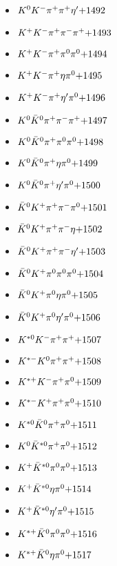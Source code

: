 \begin{multicols}{3}
\begin{itemize}
 \item $ K^{0} K^{-} \pi^{+} \pi^{+} {\eta^{\prime}} \hfill{+1492}$
 \item $ K^{+} K^{-} \pi^{+} \pi^{-} \pi^{+} \hfill{+1493}$
 \item $ K^{+} K^{-} \pi^{+} \pi^{0} \pi^{0} \hfill{+1494}$
 \item $ K^{+} K^{-} \pi^{+} \eta \pi^{0} \hfill{+1495}$
 \item $ K^{+} K^{-} \pi^{+} {\eta^{\prime}} \pi^{0} \hfill{+1496}$
 \item $ K^{0} \bar{K}^{0} \pi^{+} \pi^{-} \pi^{+} \hfill{+1497}$
 \item $ K^{0} \bar{K}^{0} \pi^{+} \pi^{0} \pi^{0} \hfill{+1498}$
 \item $ K^{0} \bar{K}^{0} \pi^{+} \eta \pi^{0} \hfill{+1499}$
 \item $ K^{0} \bar{K}^{0} \pi^{+} {\eta^{\prime}} \pi^{0} \hfill{+1500}$
 \item $ \bar{K}^{0} K^{+} \pi^{+} \pi^{-} \pi^{0} \hfill{+1501}$
 \item $ \bar{K}^{0} K^{+} \pi^{+} \pi^{-} \eta \hfill{+1502}$
 \item $ \bar{K}^{0} K^{+} \pi^{+} \pi^{-} {\eta^{\prime}} \hfill{+1503}$
 \item $ \bar{K}^{0} K^{+} \pi^{0} \pi^{0} \pi^{0} \hfill{+1504}$
 \item $ \bar{K}^{0} K^{+} \pi^{0} \eta \pi^{0} \hfill{+1505}$
 \item $ \bar{K}^{0} K^{+} \pi^{0} {\eta^{\prime}} \pi^{0} \hfill{+1506}$
 \item $ K^{*0} K^{-} \pi^{+} \pi^{+} \hfill{+1507}$
 \item $ K^{*-} K^{0} \pi^{+} \pi^{+} \hfill{+1508}$
 \item $ K^{*+} K^{-} \pi^{+} \pi^{0} \hfill{+1509}$
 \item $ K^{*-} K^{+} \pi^{+} \pi^{0} \hfill{+1510}$
 \item $ K^{*0} \bar{K}^{0} \pi^{+} \pi^{0} \hfill{+1511}$
 \item $ K^{0} \bar{K}^{*0} \pi^{+} \pi^{0} \hfill{+1512}$
 \item $ K^{+} \bar{K}^{*0} \pi^{0} \pi^{0} \hfill{+1513}$
 \item $ K^{+} \bar{K}^{*0} \eta \pi^{0} \hfill{+1514}$
 \item $ K^{+} \bar{K}^{*0} {\eta^{\prime}} \pi^{0} \hfill{+1515}$
 \item $ K^{*+} \bar{K}^{0} \pi^{0} \pi^{0} \hfill{+1516}$
 \item $ K^{*+} \bar{K}^{0} \eta \pi^{0} \hfill{+1517}$

\end{itemize}
\end{multicols}
